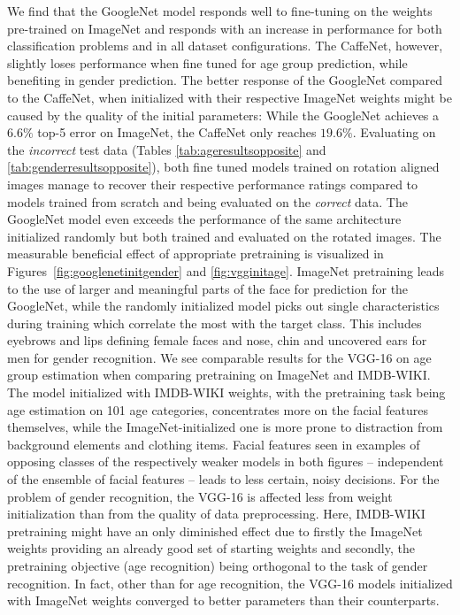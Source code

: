 \documentclass[10pt,twocolumn,letterpaper]{article}
\begin{document}
We find that the GoogleNet model responds well to fine-tuning on the weights pre-trained on ImageNet and responds with an increase in performance for both classification problems and in all dataset configurations. The CaffeNet, however, slightly loses performance when fine tuned for age group prediction, while benefiting in gender prediction. The better response of the GoogleNet compared to the CaffeNet, when initialized with their respective ImageNet weights might be caused by the quality of the initial parameters: While the GoogleNet achieves a $6.6\%$ top-5 error on ImageNet, the CaffeNet only reaches $19.6\%$.
Evaluating on the \textit{incorrect} test data (Tables \ref{tab:ageresultsopposite} and \ref{tab:genderresultsopposite}), both fine tuned models trained on rotation aligned images manage to recover their respective performance ratings compared to models trained from scratch and being evaluated on the \textit{correct} data. The GoogleNet model even exceeds the performance of the same architecture initialized randomly but both trained and evaluated on the rotated images.
The measurable beneficial effect of appropriate pretraining  is visualized in Figures~\ref{fig:googlenetinitgender} and \ref{fig:vgginitage}.
ImageNet pretraining leads to the use of larger and meaningful parts of the face for prediction for the GoogleNet, while the randomly initialized model picks out single characteristics during training which correlate the most with the target class.
This includes eyebrows and lips defining female faces and nose, chin and uncovered ears for men for gender recognition.
We see comparable results for the VGG-16 on age group estimation when comparing pretraining on ImageNet and IMDB-WIKI.
The model initialized with IMDB-WIKI weights, with the pretraining task being age estimation on 101 age categories, concentrates more on the facial features themselves, while the ImageNet-initialized one is more prone to distraction from background elements and clothing items.
Facial features seen in examples of opposing classes of the respectively weaker models in both figures -- independent of the ensemble of facial features -- leads to less certain, noisy decisions.
For the problem of gender recognition, the VGG-16 is affected less from weight initialization than from the quality of data preprocessing. Here, IMDB-WIKI pretraining might have an only diminished effect due to firstly the ImageNet weights providing an already good set of starting weights and secondly, the pretraining objective (age recognition) being orthogonal to the task of gender recognition. In fact, other than for age recognition, the VGG-16 models initialized with ImageNet weights converged to better parameters than their counterparts.
\end{document}
